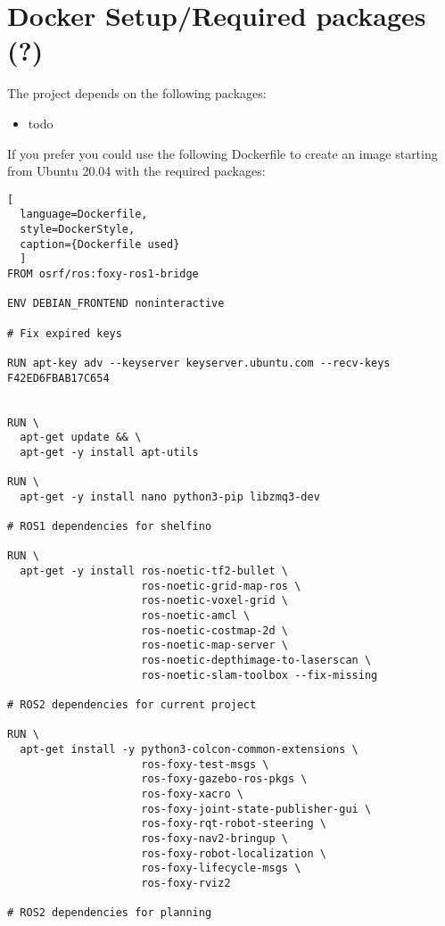 
\chapter{Docker Setup/Required packages (?)}
\label{cha:dockerfile}

The project depends on the following packages:

\begin{itemize}
    \item todo
\end{itemize}

If you prefer you could use the following Dockerfile to create an image starting from Ubuntu 20.04 with the required packages:

\begin{lstlisting}[
  language=Dockerfile,
  style=DockerStyle,
  caption={Dockerfile used}
  ]
FROM osrf/ros:foxy-ros1-bridge

ENV DEBIAN_FRONTEND noninteractive

# Fix expired keys

RUN apt-key adv --keyserver keyserver.ubuntu.com --recv-keys F42ED6FBAB17C654


RUN \
  apt-get update && \
  apt-get -y install apt-utils

RUN \
  apt-get -y install nano python3-pip libzmq3-dev

# ROS1 dependencies for shelfino
  
RUN \
  apt-get -y install ros-noetic-tf2-bullet \
                     ros-noetic-grid-map-ros \
                     ros-noetic-voxel-grid \
                     ros-noetic-amcl \
                     ros-noetic-costmap-2d \
                     ros-noetic-map-server \
                     ros-noetic-depthimage-to-laserscan \
                     ros-noetic-slam-toolbox --fix-missing

# ROS2 dependencies for current project

RUN \
  apt-get install -y python3-colcon-common-extensions \
                     ros-foxy-test-msgs \
                     ros-foxy-gazebo-ros-pkgs \
                     ros-foxy-xacro \
                     ros-foxy-joint-state-publisher-gui \
                     ros-foxy-rqt-robot-steering \
                     ros-foxy-nav2-bringup \
                     ros-foxy-robot-localization \
                     ros-foxy-lifecycle-msgs \
                     ros-foxy-rviz2

# ROS2 dependencies for planning


\end{lstlisting}
